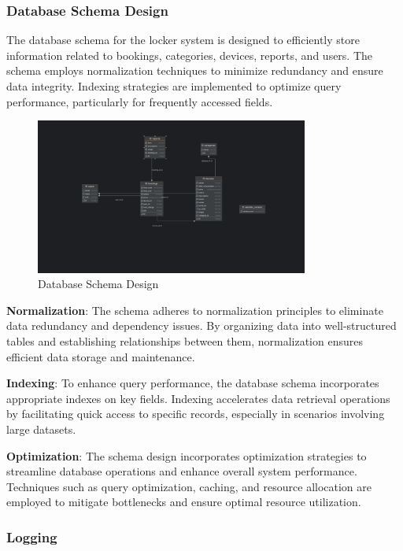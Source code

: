 \subsubsection{Database Schema Design}

The database schema for the locker system is designed to efficiently store information related to bookings, categories, devices, reports, and users. The schema employs normalization techniques to minimize redundancy and ensure data integrity. Indexing strategies are implemented to optimize query performance, particularly for frequently accessed fields.

\begin{figure}[h]
    \centering
    \includegraphics[width=0.8\textwidth]{images/db_schema}
    \caption{Database Schema Design}
    \label{fig:dbschema}
\end{figure}

\textbf{Normalization}:
The schema adheres to normalization principles to eliminate data redundancy and dependency issues. By organizing data into well-structured tables and establishing relationships between them, normalization ensures efficient data storage and maintenance.

\textbf{Indexing}:
To enhance query performance, the database schema incorporates appropriate indexes on key fields. Indexing accelerates data retrieval operations by facilitating quick access to specific records, especially in scenarios involving large datasets.

\textbf{Optimization}:
The schema design incorporates optimization strategies to streamline database operations and enhance overall system performance. Techniques such as query optimization, caching, and resource allocation are employed to mitigate bottlenecks and ensure optimal resource utilization.

\subsubsection{Logging}

